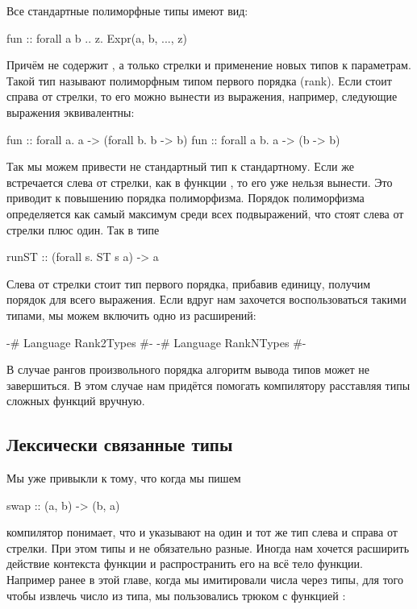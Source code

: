 Все стандартные полиморфные типы имеют вид:

\begin{code}
fun :: forall a b .. z. Expr(a, b, ..., z)
\end{code}

Причём  не содержит , а только
стрелки и применение новых типов к параметрам. 
Такой тип называют полиморфным типом первого порядка (rank).
Если  стоит справа от стрелки, то его
можно вынести из выражения, например, следующие выражения
эквивалентны:

\begin{code}
fun :: forall a.   a -> (forall b. b -> b)
fun :: forall a b. a -> (b -> b)
\end{code}

Так мы можем привести не стандартный тип к стандартному.
Если же  встречается слева от стрелки,
как в функции , то его уже нельзя вынести. 
Это приводит к повышению порядка полиморфизма. 
Порядок полиморфизма определяется как самый максимум
среди всех подвыражений, что стоят слева от стрелки
плюс один. Так в типе 

\begin{code}
runST :: (forall s. ST s a) -> a
\end{code}

Слева от стрелки стоит тип первого порядка, прибавив единицу,
получим порядок для всего выражения. Если вдруг нам захочется
воспользоваться такими типами, мы можем включить одно
из расширений:

\begin{code}
{-# Language Rank2Types #-}
{-# Language RankNTypes #-}
\end{code}

В случае рангов произвольного порядка алгоритм вывода типов
может не завершиться. В этом случае нам придётся помогать
компилятору расставляя типы сложных функций вручную. 


\subsection{Лексически связанные типы}

Мы уже привыкли к тому, что когда мы пишем

\begin{code}
swap :: (a, b) -> (b, a)
\end{code}

\noindent компилятор понимает, что  и 
указывают на один и тот же тип слева и справа от стрелки. 
При этом типы  и  не обязательно разные. 
Иногда нам хочется расширить действие контекста
функции и распространить его на всё тело функции. 
Например ранее в этой главе, когда мы имитировали
числа через типы, для того чтобы извлечь число из
типа, мы пользовались трюком с функцией :

